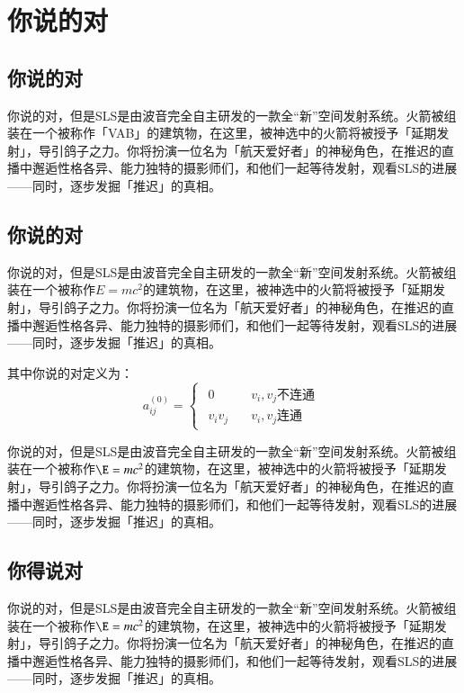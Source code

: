 \iffalse
\fi


\chapter{你说的对}

\section{你说的对}

你说的对，但是SLS是由波音完全自主研发的一款全“新”空间发射系统。火箭被组装在一个被称作「VAB」的建筑物，在这里，被神选中的火箭将被授予「延期发射」，导引鸽子之力。你将扮演一位名为「航天爱好者」的神秘角色，在推迟的直播中邂逅性格各异、能力独特的摄影师们，和他们一起等待发射，观看SLS的进展——同时，逐步发掘「推迟」的真相。


\section{你说的对}
你说的对，但是SLS是由波音完全自主研发的一款全“新”空间发射系统。火箭被组装在一个被称作$E=mc^2$的建筑物，在这里，被神选中的火箭将被授予「延期发射」，导引鸽子之力。你将扮演一位名为「航天爱好者」的神秘角色，在推迟的直播中邂逅性格各异、能力独特的摄影师们，和他们一起等待发射，观看SLS的进展——同时，逐步发掘「推迟」的真相。

其中你说的对定义为：
\begin{equation}
	a_{ij}^{(0)}=
	\begin{cases}
		\begin{aligned}
			0\quad &\quad v_i,v_j不连通\\
			v_iv_j &\quad v_i,v_j连通
		\end{aligned}
	\end{cases}
\end{equation}

你说的对，但是SLS是由波音完全自主研发的一款全“新”空间发射系统。火箭被组装在一个被称作$\E=mc^2$的建筑物，在这里，被神选中的火箭将被授予「延期发射」，导引鸽子之力。你将扮演一位名为「航天爱好者」的神秘角色，在推迟的直播中邂逅性格各异、能力独特的摄影师们，和他们一起等待发射，观看SLS的进展——同时，逐步发掘「推迟」的真相。
\section{你得说对}
你说的对，但是SLS是由波音完全自主研发的一款全“新”空间发射系统。火箭被组装在一个被称作$\E=mc^2$的建筑物，在这里，被神选中的火箭将被授予「延期发射」，导引鸽子之力。你将扮演一位名为「航天爱好者」的神秘角色，在推迟的直播中邂逅性格各异、能力独特的摄影师们，和他们一起等待发射，观看SLS的进展——同时，逐步发掘「推迟」的真相。

